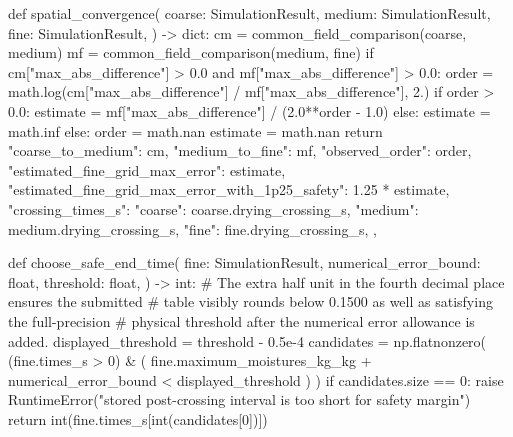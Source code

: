 \documentclass[withoutpreface,bwprint]{cumcmthesis}
\begin{document}
\begin{PythonCode}
def spatial_convergence(
    coarse: SimulationResult,
    medium: SimulationResult,
    fine: SimulationResult,
) -> dict:
    cm = common_field_comparison(coarse, medium)
    mf = common_field_comparison(medium, fine)
    if cm["max_abs_difference"] > 0.0 and mf["max_abs_difference"] > 0.0:
        order = math.log(cm["max_abs_difference"] / mf["max_abs_difference"], 2.)
        if order > 0.0:
            estimate = mf["max_abs_difference"] / (2.0**order - 1.0)
        else:
            estimate = math.inf
    else:
        order = math.nan
        estimate = math.nan
    return {
        "coarse_to_medium": cm,
        "medium_to_fine": mf,
        "observed_order": order,
        "estimated_fine_grid_max_error": estimate,
        "estimated_fine_grid_max_error_with_1p25_safety": 1.25 * estimate,
        "crossing_times_s": {
            "coarse": coarse.drying_crossing_s,
            "medium": medium.drying_crossing_s,
            "fine": fine.drying_crossing_s,
        },
    }


def choose_safe_end_time(
    fine: SimulationResult,
    numerical_error_bound: float,
    threshold: float,
) -> int:
    # The extra half unit in the fourth decimal place ensures the submitted
    # table visibly rounds below 0.1500 as well as satisfying the full-precision
    # physical threshold after the numerical error allowance is added.
    displayed_threshold = threshold - 0.5e-4
    candidates = np.flatnonzero(
        (fine.times_s > 0)
        & (
            fine.maximum_moistures_kg_kg + numerical_error_bound
            < displayed_threshold
        )
    )
    if candidates.size == 0:
        raise RuntimeError("stored post-crossing interval is too short for safety margin")
    return int(fine.times_s[int(candidates[0])])
\end{PythonCode}
\end{document}

